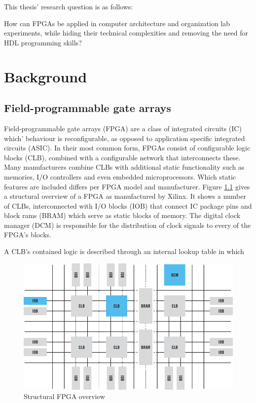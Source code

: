 \documentclass[openright]{template/uva-bachelor-thesis}
\begin{document}
This thesis' research question is as follows: 

\begin{displayquote}
How can FPGAs be applied in computer architecture and organization lab experiments, while hiding their technical complexities and removing the need for HDL programming skills?
\end{displayquote}







\chapter{Background}


\section{Field-programmable gate arrays}
Field-programmable gate arrays (FPGA) are a class of integrated circuits (IC) which' behaviour is reconfigurable, as opposed to application specific integrated circuits (ASIC). In their most common form, FPGAs consist of configurable logic blocks (CLB), combined with a configurable network that interconnects these. Many manufacturers combine CLBs with additional static functionality such as memories, I/O controllers and even embedded microprocessors. Which static features are included differs per FPGA model and manufacturer. Figure \ref{fig:fpgastructure} gives a structural overview of a FPGA as manufactured by Xilinx. It shows a number of CLBs, interconnected with I/O blocks (IOB) that connect IC package pins and block rams (BRAM) which serve as static blocks of memory. The digital clock manager (DCM) is responsible for the distribution of clock signals to every of the FPGA's blocks. 

A CLB's contained logic is described through an internal lookup table in which 

\begin{figure}
\centering
\includegraphics[width=.7\textwidth]{img/fpga-block-structure}
\caption{Structural FPGA overview \cite{xilinxFPGA}}
\label{fig:fpgastructure}
\end{figure}
\end{document}
